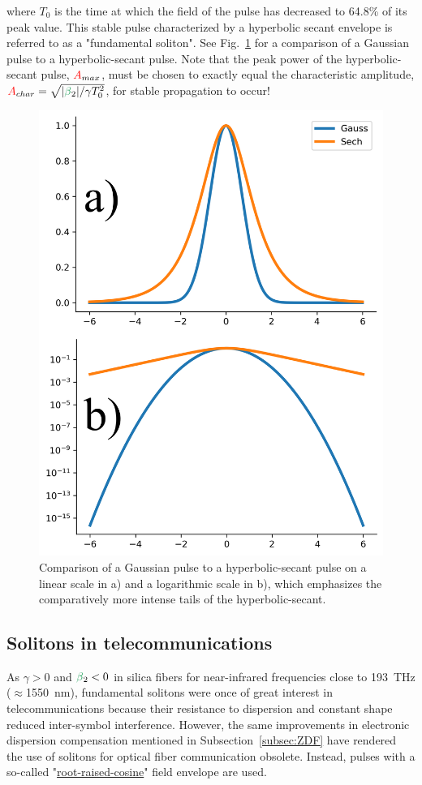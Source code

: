 where $T_0$ is the time at which the field of the pulse has decreased to 64.8\% of its peak value. This stable pulse characterized by a hyperbolic secant envelope is referred to as a "fundamental soliton". See Fig.~\ref{fig:gauss_sech} for a comparison of a Gaussian pulse to a hyperbolic-secant pulse. Note that the peak power of the hyperbolic-secant pulse, $\textcolor{red}{A}_{max}$, must be chosen to exactly equal the characteristic amplitude, $\A_{char}=\sqrt{|\betag_2|/\gamma T_0^2}$, for stable propagation to occur!
\begin{figure}
    \centering
    \includegraphics[width=1\linewidth]{figures/gauss_sech_comparison.png}
    \caption{Comparison of a Gaussian pulse to a hyperbolic-secant pulse on a linear scale in a) and a logarithmic scale in b), which emphasizes the comparatively more intense tails of the hyperbolic-secant.  }
    \label{fig:gauss_sech}
\end{figure}
\subsection{Solitons in telecommunications}
As $\gamma>0$ and $\betag_2<0$ in silica fibers for near-infrared frequencies close to 193~THz ($\approx$1550~nm), fundamental solitons were once of great interest in telecommunications because their resistance to dispersion and constant shape reduced inter-symbol interference. However, the same improvements in electronic dispersion compensation mentioned in Subsection~\ref{subsec:ZDF} have rendered the use of solitons for optical fiber communication obsolete. Instead, pulses with a so-called "\href{https://www.youtube.com/watch?v=hCk_cg-OfUQ}{root-raised-cosine}" field envelope are used.   


